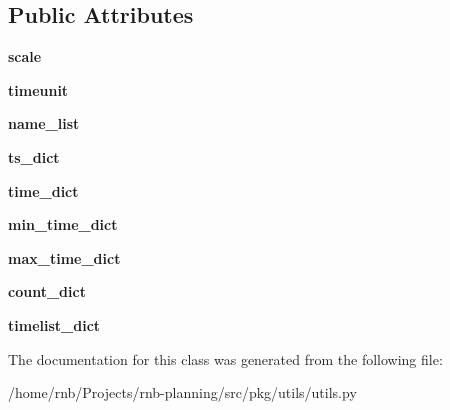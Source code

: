 \subsection*{Public Attributes}
\begin{DoxyCompactItemize}
\item 
\mbox{\label{classrnb-planning_1_1src_1_1pkg_1_1utils_1_1utils_1_1_global_timer_abd9978d3bda1fbdb9d3874fc55ebd017}} 
{\bfseries scale}
\item 
\mbox{\label{classrnb-planning_1_1src_1_1pkg_1_1utils_1_1utils_1_1_global_timer_a861ede3ba39d6900403a2cc88ce63e8b}} 
{\bfseries timeunit}
\item 
\mbox{\label{classrnb-planning_1_1src_1_1pkg_1_1utils_1_1utils_1_1_global_timer_a8e78cdcf05bce5661e67f6058ad49dc4}} 
{\bfseries name\+\_\+list}
\item 
\mbox{\label{classrnb-planning_1_1src_1_1pkg_1_1utils_1_1utils_1_1_global_timer_a8923c165caa41bc2c7208cabae9e3c23}} 
{\bfseries ts\+\_\+dict}
\item 
\mbox{\label{classrnb-planning_1_1src_1_1pkg_1_1utils_1_1utils_1_1_global_timer_ab740ae368c70560ce5b9865d4c37e454}} 
{\bfseries time\+\_\+dict}
\item 
\mbox{\label{classrnb-planning_1_1src_1_1pkg_1_1utils_1_1utils_1_1_global_timer_af5cdf2eb1bad1a3b00d3f4a35f17768d}} 
{\bfseries min\+\_\+time\+\_\+dict}
\item 
\mbox{\label{classrnb-planning_1_1src_1_1pkg_1_1utils_1_1utils_1_1_global_timer_ac5dc237142af2e0521fb2bd69746a692}} 
{\bfseries max\+\_\+time\+\_\+dict}
\item 
\mbox{\label{classrnb-planning_1_1src_1_1pkg_1_1utils_1_1utils_1_1_global_timer_a8b615f5d198abed8b33a9f05d5992f7e}} 
{\bfseries count\+\_\+dict}
\item 
\mbox{\label{classrnb-planning_1_1src_1_1pkg_1_1utils_1_1utils_1_1_global_timer_a9428b421290234f85171cd52c2465fe2}} 
{\bfseries timelist\+\_\+dict}
\end{DoxyCompactItemize}


The documentation for this class was generated from the following file\+:\begin{DoxyCompactItemize}
\item 
/home/rnb/\+Projects/rnb-\/planning/src/pkg/utils/utils.\+py\end{DoxyCompactItemize}
